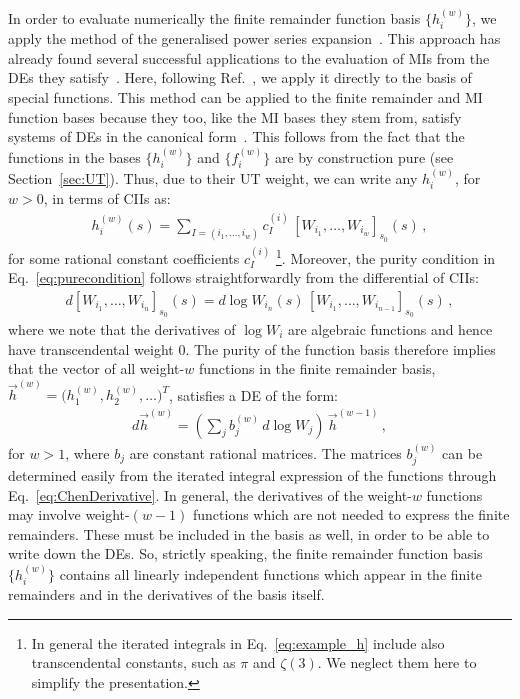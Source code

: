 \documentclass[main.tex]{subfiles}
\begin{document}
In order to evaluate numerically the finite remainder function basis $\{h^{(w)}_i\}$, we apply the method of the generalised power series expansion~\cite{Francesco:2019yqt}. This approach has already found several successful applications to the evaluation of MIs from the DEs they satisfy~\cite{Francesco:2019yqt,Bonciani:2019jyb,Frellesvig:2019byn,Abreu:2020jxa,Becchetti:2020wof,Bonciani:2021zzf,abreu2021twoloop}. Here, following Ref.~\cite{Badger:2021nhg}, we apply it directly to the basis of special functions. This method can be applied to the finite remainder and MI function bases because they too, like the MI bases they stem from, satisfy systems of DEs in the canonical form~\cite{Henn:2013pwa}. This follows from the fact that the functions in the bases $\{h^{(w)}_i\}$ and $\{f^{(w)}_i\}$ are by construction pure (see Section~\ref{sec:UT}). Thus, due to their UT weight, we can write any $h^{(w)}_i$, for $w>0$, in terms of CIIs as:
\begin{align} \label{eq:example_h}
h^{(w)}_{i}(s) = \sum_{I = (i_1,\ldots,i_w)} c_I^{(i)} \, \left[W_{i_1}, \ldots, W_{i_w}  \right]_{s_0} (s) \, ,
\end{align}
for some rational constant coefficients $c_I^{(i)}$ \footnote{In general the iterated integrals in Eq.~\ref{eq:example_h} include also transcendental constants, such as $\pi$ and $\zeta(3)$. We neglect them here to simplify the presentation.}.
Moreover, the purity condition in Eq.~\ref{eq:purecondition} follows straightforwardly from the differential of CIIs:
\begin{align} \label{eq:ChenDerivative}
d \left[W_{i_1}, \ldots, W_{i_n}  \right]_{s_0} (s) = d \log W_{i_n}(s) \, \left[W_{i_1}, \ldots, W_{i_{n-1}}  \right]_{s_0} (s) \,,
\end{align}
where we note that the derivatives of $\log W_i$ are algebraic functions and hence have transcendental weight $0$.
The purity of the function basis therefore implies that the vector of all weight-$w$ functions in the finite remainder basis, $\vec{h}^{(w)}= \bigl(h^{(w)}_1, h^{(w)}_2, \ldots \bigr)^T$, satisfies a DE of the form:
\begin{align} \label{eq:dhw}
d \vec{h}^{(w)} = \left( \sum_{j} b_j^{(w)} \, d\log W_j  \right) \,  \vec{h}^{(w-1)} \,,
\end{align}
for $w>1$, where $b_j$ are constant rational matrices. The matrices $b_j^{(w)}$ can be determined easily from the iterated integral expression of the functions through Eq.~\ref{eq:ChenDerivative}. 
In general, the derivatives of the weight-$w$ functions may involve weight-$(w-1)$ functions which are not needed to express the finite remainders. These must be included in the basis as well, in order to be able to write down the DEs. So, strictly speaking, the finite remainder function basis $\{h^{(w)}_i\}$ contains all linearly independent functions which appear in the finite remainders and in the derivatives of the basis itself.
\end{document}
